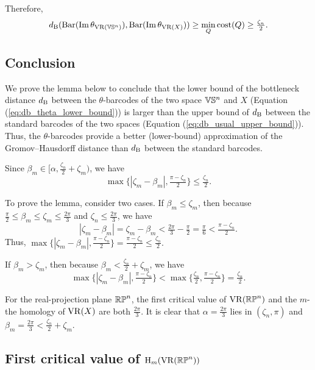 Therefore, 
\begin{equation}\label{eq:db_theta_lower_bound}
    d_{\mathrm{B}}(\operatorname{Bar}(\operatorname{Im} \theta_{\operatorname{VR}(\mathbb{V}\mathbb{S}^n)}), \operatorname{Bar}(\operatorname{Im} \theta_{\operatorname{VR}(X)}))
    \geq \min_Q \mathrm{cost}(Q) 
    \geq \tfrac{\zeta_n}{2}.
\end{equation}

\subsection{Conclusion}

We prove the lemma below to conclude that the lower bound of the bottleneck distance $d_{\mathrm{B}}$ between the $\theta$-barcodes of the two space $\mathbb{V}\mathbb{S}^n$ and $X$ (Equation (\ref{eq:db_theta_lower_bound}))  is larger than the upper bound of $d_{\mathrm{B}}$ between the standard barcodes of the two spaces (Equation (\ref{eq:db_usual_upper_bound})). 
Thus, the $\theta$-barcodes provide a better (lower-bound) approximation of the Gromov--Hausdorff distance than $d_{\mathrm{B}}$ between the standard barcodes.

\lemma Since $\beta_m\in [\alpha, \tfrac{\zeta_n}{2}+\zeta_m)$, we have 
\[
    \max\{|\zeta_m - \beta_m|, \tfrac{\pi - \zeta_n}{2}\}
    \leq \tfrac{\zeta_n}{2}.
\]

To prove the lemma, consider two cases. 
If $\beta_m \leq \zeta_m$, then because $\tfrac{\pi}{2} \leq \beta_m\leq \zeta_m \leq \tfrac{2\pi}{3}$ and $\zeta_n \leq \tfrac{2\pi}{3}$, we have
\[
    |\zeta_m - \beta_m| 
    = \zeta_m - \beta_m 
    < \tfrac{2\pi}{3} - \tfrac{\pi}{2} 
    = \tfrac{\pi}{6} 
    < \tfrac{\pi - \zeta_n}{2}.
\]
Thus, $\max\{|\zeta_m - \beta_m|, \tfrac{\pi - \zeta_n}{2}\} = \tfrac{\pi - \zeta_n}{2} \leq \tfrac{\zeta_n}{2}.$

If $\beta_m>\zeta_m$, then because $\beta_m <\tfrac{\zeta_n}{2}+\zeta_m$, we have
\[
    \max\{|\zeta_m - \beta_m|, \tfrac{\pi - \zeta_n}{2}\}
    < \max\{\tfrac{\zeta_n}{2}, \tfrac{\pi - \zeta_n}{2}\}
    = \tfrac{\zeta_n}{2} .
\]

\example For the real-projection plane $\mathbb{RP}^n$, the first critical value of $\operatorname{VR}(\mathbb{RP}^n)$ and the $m$-the homology of $\operatorname{VR}(X)$ are both $\tfrac{2\pi}{3}$. %
It is clear that $\alpha= \tfrac{2\pi}{3}$ lies in $(\zeta_n, \pi)$ and $\beta_m= \tfrac{2\pi}{3} < \tfrac{\zeta_n}{2}+\zeta_m.$



\subsection{First critical value of $\operatorname{H}_m(\operatorname{VR}(\mathbb{RP}^n))$}

